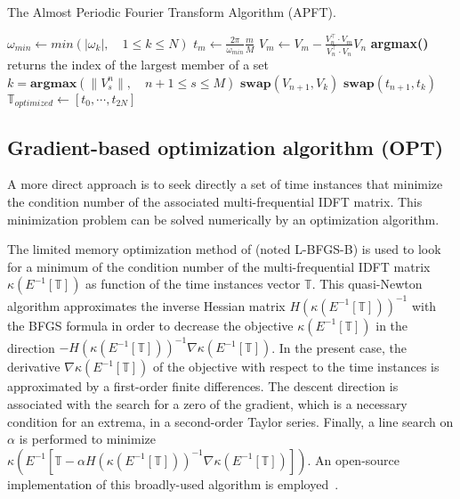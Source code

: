 \begin{algorithm}
\caption{The Almost Periodic Fourier Transform Algorithm (APFT).}
\label{alg:algo_APFT}
\begin{algorithmic}
\STATE $\omega_{min} \leftarrow min \left( |\omega_k |,\quad 1 \leqslant k \leqslant N \right)$
    \STATE $t_m \leftarrow \displaystyle\frac{2\pi}{\omega_{min}}\frac{m}{M}$
\ENDFOR
{}
  \STATE $ V_{m} \leftarrow V_{m} - \displaystyle\frac{V_{n}^\top \cdot V_{m}}{V_{n}^\top \cdot V_{n}} V_{n}$
   \ENDFOR
   \STATE \textbf{argmax()} returns the index of the largest member of a set
   \STATE $k=\textbf{argmax} \left( \| V_s^n \|,\quad n+1\leqslant s \leqslant M\right) $
   \STATE $\textbf{swap}(V_{n+1},V_{k})$
   \STATE $\textbf{swap}(t_{n+1},t_{k})$
\ENDFOR
\STATE $\mathbb{T}_{optimized} \leftarrow [t_0, \cdots, t_{2N}]$
\end{algorithmic}
\end{algorithm}

\subsection{Gradient-based optimization algorithm (OPT)}
\label{sec:algo_opt}
A more direct approach is to seek directly a set of time instances
that minimize the condition number of the associated multi-frequential IDFT matrix. 
This minimization problem can be solved numerically by an optimization algorithm.

The limited memory optimization method of
\citet{Byrd1995} (noted L-BFGS-B) is
used to look for a minimum of the condition number of the
multi-frequential IDFT matrix $\kappa \left(E^{-1} \left[\mathbb{T} \right]
\right)$ as function of the time instances vector $\mathbb{T}$. This
quasi-Newton algorithm approximates the inverse Hessian matrix
$H(\kappa \left(E^{-1} \left[\mathbb{T} \right] \right))^{-1}$ with the
BFGS formula in order to decrease the objective $\kappa \left(E^{-1}
  \left[\mathbb{T} \right] \right)$ in the direction $-H(\kappa
\left(E^{-1} \left[\mathbb{T} \right] \right))^{-1}\nabla \kappa \left(E^{-1}
  \left[\mathbb{T} \right] \right)$. In the present case, the
derivative $\nabla \kappa \left(E^{-1} \left[\mathbb{T} \right] \right)$ of
the objective with respect to the time instances is approximated by
a first-order finite differences. The descent direction is
associated with the search for a zero of the gradient, which is a
necessary condition for an extrema, in a second-order Taylor series.
Finally, a line search on $\alpha$ is performed to minimize $\kappa
\left(E^{-1} \left[\mathbb{T} - \alpha H(\kappa \left(E^{-1} \left[\mathbb{T}
      \right] \right))^{-1} \nabla \kappa \left(E^{-1} \left[\mathbb{T}
      \right] \right) \right] \right)$.  An open-source implementation of this
broadly-used algorithm is
employed~\cite{Nocedal1980}.

